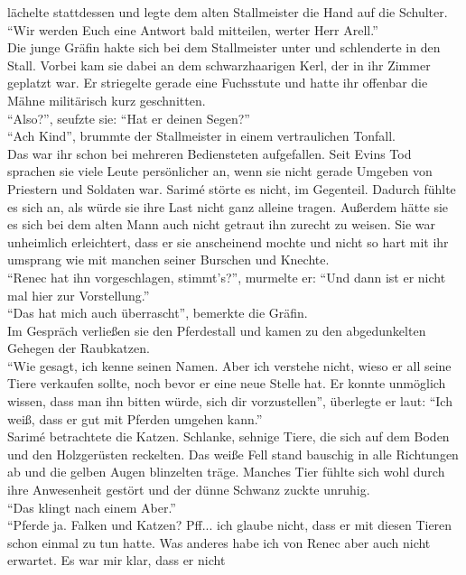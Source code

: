 lächelte stattdessen und legte dem alten Stallmeister die Hand auf die Schulter. ``Wir werden Euch 
eine Antwort bald mitteilen, werter Herr Arell.''\\
Die junge Gräfin hakte sich bei dem Stallmeister unter und schlenderte in den Stall. Vorbei kam sie 
dabei an dem schwarzhaarigen Kerl, der in ihr Zimmer geplatzt war. Er striegelte gerade eine 
Fuchsstute und hatte ihr offenbar die Mähne militärisch kurz geschnitten.\\
``Also?'', seufzte sie: ``Hat er deinen Segen?''\\
``Ach Kind'', brummte der Stallmeister in einem vertraulichen Tonfall.\\
Das war ihr schon bei mehreren Bediensteten aufgefallen. Seit Evins Tod sprachen sie viele Leute 
persönlicher an, wenn sie nicht gerade Umgeben von Priestern und Soldaten war. Sarimé störte es 
nicht, im Gegenteil. Dadurch fühlte es sich an, als würde sie ihre Last nicht ganz alleine tragen. 
Außerdem hätte sie es sich bei dem alten Mann auch nicht getraut ihn zurecht zu weisen. Sie war 
unheimlich erleichtert, dass er sie anscheinend mochte und nicht so hart mit ihr umsprang wie mit 
manchen seiner Burschen und Knechte.\\
``Renec hat ihn vorgeschlagen, stimmt's?'', murmelte er: ``Und dann ist er nicht mal hier zur
Vorstellung.''\\
``Das hat mich auch überrascht'', bemerkte die Gräfin.\\
Im Gespräch verließen sie den Pferdestall und kamen zu den abgedunkelten Gehegen der Raubkatzen.\\
``Wie gesagt, ich kenne seinen Namen. Aber ich verstehe nicht, wieso er all seine Tiere verkaufen 
sollte, noch bevor er eine neue Stelle hat. Er konnte unmöglich wissen, dass man ihn bitten würde, 
sich dir vorzustellen'', überlegte er laut: ``Ich weiß, dass er gut mit Pferden umgehen kann.''\\
Sarimé betrachtete die Katzen. Schlanke, sehnige Tiere, die sich auf dem Boden und den Holzgerüsten 
reckelten. Das weiße Fell stand bauschig in alle Richtungen ab und die gelben Augen blinzelten 
träge. Manches Tier fühlte sich wohl durch ihre Anwesenheit gestört und der dünne Schwanz zuckte 
unruhig.\\
``Das klingt nach einem Aber.''\\
``Pferde ja. Falken und Katzen? Pff... ich glaube nicht, dass er mit diesen Tieren schon einmal zu 
tun hatte. Was anderes habe ich von Renec aber auch nicht erwartet. Es war mir klar, dass er nicht 
